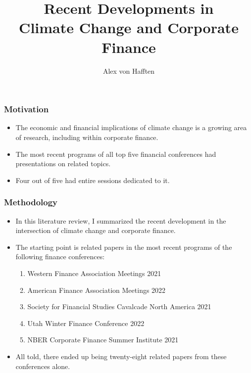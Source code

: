 \documentclass[handout]{beamer}
\title[Climate Change and Corporate Finance]{Recent Developments in \\ Climate Change and Corporate Finance}
\author{Alex von Hafften}
\institute{UW-Madison}
\begin{document}
\begin{frame}
\titlepage
\end{frame}

\begin{frame}
\frametitle{Motivation}

\begin{itemize}[<+->]

\item The economic and financial implications of climate change is a growing area of research, including within corporate finance.

\bigskip

\item The most recent programs of all top five financial conferences had presentations on related topics.

\bigskip

\item Four out of five had entire sessions dedicated to it.

\end{itemize}

\end{frame}

\begin{frame}
\frametitle{Methodology}

\begin{itemize}[<+->]

\item In this literature review, I summarized the recent development in the intersection of climate change and corporate finance.

\bigskip

\item The starting point is related papers in the most recent programs of the following finance conferences:

\begin{enumerate}

\item Western Finance Association Meetings 2021
\item American Finance Association Meetings 2022
\item Society for Financial Studies Cavalcade North America 2021
\item Utah Winter Finance Conference 2022
\item NBER Corporate Finance Summer Institute 2021

\end{enumerate}

\bigskip

\item All told, there ended up being twenty-eight related papers from these conferences alone.

\end{itemize}

\end{frame}
\end{document}
